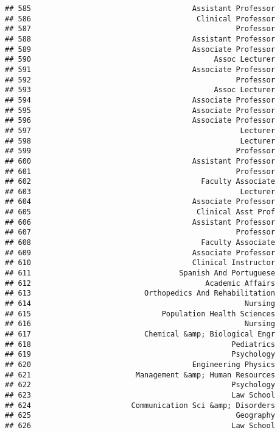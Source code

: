 \documentclass[
]{article}
\begin{document}
\begin{verbatim}
## 585                                     Assistant Professor
## 586                                      Clinical Professor
## 587                                               Professor
## 588                                     Assistant Professor
## 589                                     Associate Professor
## 590                                          Assoc Lecturer
## 591                                     Associate Professor
## 592                                               Professor
## 593                                          Assoc Lecturer
## 594                                     Associate Professor
## 595                                     Associate Professor
## 596                                     Associate Professor
## 597                                                Lecturer
## 598                                                Lecturer
## 599                                               Professor
## 600                                     Assistant Professor
## 601                                               Professor
## 602                                       Faculty Associate
## 603                                                Lecturer
## 604                                     Associate Professor
## 605                                      Clinical Asst Prof
## 606                                     Assistant Professor
## 607                                               Professor
## 608                                       Faculty Associate
## 609                                     Associate Professor
## 610                                     Clinical Instructor
## 611                                  Spanish And Portuguese
## 612                                        Academic Affairs
## 613                          Orthopedics And Rehabilitation
## 614                                                 Nursing
## 615                              Population Health Sciences
## 616                                                 Nursing
## 617                          Chemical &amp; Biological Engr
## 618                                              Pediatrics
## 619                                              Psychology
## 620                                     Engineering Physics
## 621                        Management &amp; Human Resources
## 622                                              Psychology
## 623                                              Law School
## 624                       Communication Sci &amp; Disorders
## 625                                               Geography
## 626                                              Law School

\end{verbatim}
\end{document}
